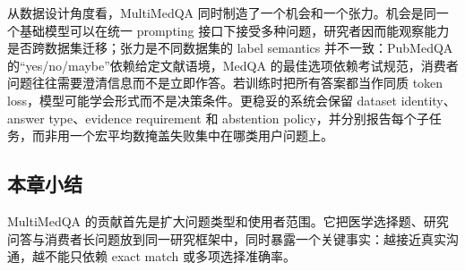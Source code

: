 从数据设计角度看，MultiMedQA 同时制造了一个机会和一个张力。机会是同一个基础模型可以在统一 prompting 接口下接受多种问题，研究者因而能观察能力是否跨数据集迁移；张力是不同数据集的 label semantics 并不一致：PubMedQA 的“yes/no/maybe”依赖给定文献语境，MedQA 的最佳选项依赖考试规范，消费者问题往往需要澄清信息而不是立即作答。若训练时把所有答案都当作同质 token loss，模型可能学会形式而不是决策条件。更稳妥的系统会保留 dataset identity、answer type、evidence requirement 和 abstention policy，并分别报告每个子任务，而非用一个宏平均数掩盖失败集中在哪类用户问题上。


\subsection{本章小结}

MultiMedQA 的贡献首先是扩大问题类型和使用者范围。它把医学选择题、研究问答与消费者长问题放到同一研究框架中，同时暴露一个关键事实：越接近真实沟通，越不能只依赖 exact match 或多项选择准确率。

